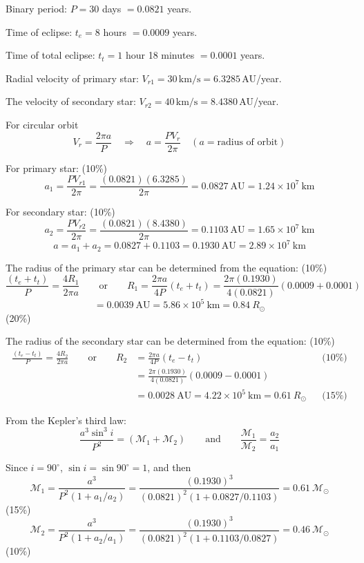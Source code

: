 
Binary period: $P = 30$ days $= 0.0821$ years.

Time of eclipse: $t_e = 8$ hours $= 0.0009$ years.

Time of total eclipse: $t_t = 1$ hour 18 minutes $= 0.0001$ years.

Radial velocity of primary star: $V_{r1} = 30\,\mathrm{km/s}
= 6.3285$\,AU/year.

The velocity of secondary star: $V_{r2} = 40\,\mathrm{km/s}
= 8.4380$\,AU/year.

For circular orbit
\[ V_r = \frac{2\pi a}{P} \quad\Longrightarrow\quad
   a = \frac{P V_r}{2\pi} \quad (a = \text{radius of orbit}) \]

For primary star: \hfill(10\%)
\[ a_1 = \frac{P V_{r1}}{2\pi}
   = \frac{(0.0821)(6.3285)}{2\pi}
   = 0.0827\ \mathrm{AU} = 1.24 \times 10^7\ \mathrm{km} \]

For secondary star: \hfill(10\%)
\[ a_2 = \frac{P V_{r2}}{2\pi}
   = \frac{(0.0821)(8.4380)}{2\pi}
   = 0.1103\ \mathrm{AU} = 1.65 \times 10^7\ \mathrm{km} \]
\[ a = a_1 + a_2 = 0.0827 + 0.1103
   = 0.1930\ \mathrm{AU} = 2.89 \times 10^7\ \mathrm{km} \]

The radius of the primary star can be determined from the equation:
\hfill(10\%)
\[ \frac{(t_e + t_t)}{P} = \frac{4R_1}{2\pi a}
   \qquad\text{or}\qquad
   R_1 = \frac{2\pi a}{4P}(t_e + t_t)
   = \frac{2\pi(0.1930)}{4(0.0821)}(0.0009 + 0.0001) \]
\[ = 0.0039\ \mathrm{AU} = 5.86 \times 10^5\ \mathrm{km}
   = 0.84\ R_\odot \]
\hfill(20\%)

The radius of the secondary star can be determined from the equation:
\hfill(10\%)
\begin{align*}
\frac{(t_e - t_t)}{P} = \frac{4R_2}{2\pi a}
  \qquad\text{or}\qquad
  R_2 &= \frac{2\pi a}{4P}(t_e - t_t)
  && \text{(10\%)} \\
  &= \frac{2\pi(0.1930)}{4(0.0821)}(0.0009 - 0.0001) \\
  &= 0.0028\ \mathrm{AU} = 4.22 \times 10^5\ \mathrm{km} = 0.61\ R_\odot
  && \text{(15\%)}
\end{align*}

From the Kepler's third law:
\[ \frac{a^3 \sin^3 i}{P^2} = \left(\mathcal{M}_1 + \mathcal{M}_2\right)
   \qquad\text{and}\qquad
   \frac{\mathcal{M}_1}{\mathcal{M}_2} = \frac{a_2}{a_1} \]

Since $i = 90^\circ$, $\sin i = \sin 90^\circ = 1$, and then
\[ \mathcal{M}_1 = \frac{a^3}{P^2(1 + a_1/a_2)}
   = \frac{(0.1930)^3}{(0.0821)^2(1 + 0.0827/0.1103)}
   = 0.61\ \mathcal{M}_\odot \]
\hfill(15\%)
\[ \mathcal{M}_2 = \frac{a^3}{P^2(1 + a_2/a_1)}
   = \frac{(0.1930)^3}{(0.0821)^2(1 + 0.1103/0.0827)}
   = 0.46\ \mathcal{M}_\odot \]
\hfill(10\%)
